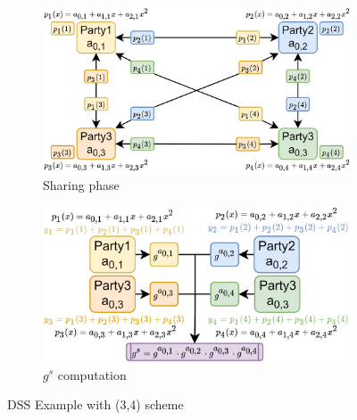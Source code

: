 \begin{figure}[h]
\vspace{-10pt}
    \centering
    \begin{subfigure}[b]{0.5\textwidth}
    \includegraphics[width=\textwidth]{image/secret_sharing/dssa.png}
    \caption{Sharing phase}
    \label{fig:dssa}
    \end{subfigure}\quad
    \begin{subfigure}[b]{0.48\textwidth}
    \includegraphics[width=\textwidth]{image/secret_sharing/dssb.png}
    \caption{$g^s$ computation}
    \label{fig:dssb}
    \end{subfigure}
    \caption{DSS Example with (3,4) scheme}
\end{figure}

